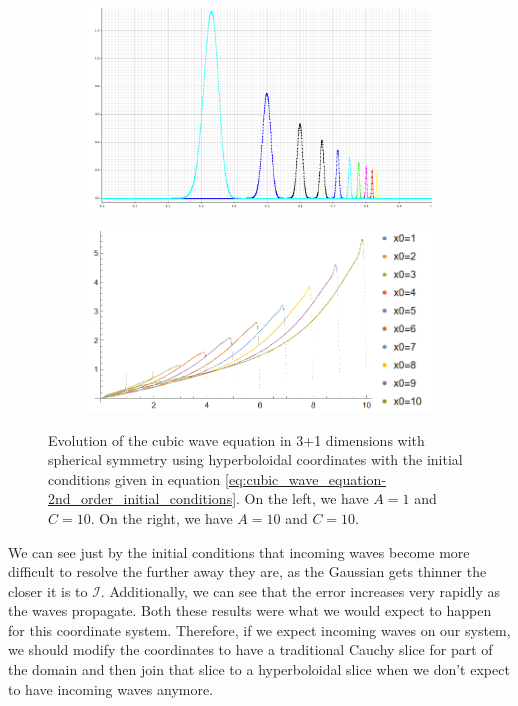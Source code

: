 \begin{figure}[h]
    \centering
    \begin{subfigure}[b]{0.45\textwidth}
        \centering
        \includegraphics[width=\textwidth]{Images/Incoming_IC.png}
    \end{subfigure}
    \hfill
    \begin{subfigure}[b]{0.45\textwidth}
        \centering
        \includegraphics[width=\textwidth]{Images/Incoming_Error.png}
    \end{subfigure}
    \caption{Evolution of the cubic wave equation in 3+1 dimensions with spherical symmetry using hyperboloidal coordinates with the initial conditions given in equation \eqref{eq:cubic_wave_equation-2nd_order_initial_conditions}. On the left, we have $A=1$ and $C=10$. On the right, we have  $A=10$ and $C=10$.}
    \label{fig:Incoming_Waves}
\end{figure}

We can see just by the initial conditions that incoming waves become more difficult to resolve the further away they are, as the Gaussian gets thinner the closer it is to $\mathscr{I}$. Additionally, we can see that the error increases very rapidly as the waves propagate. Both these results were what we would expect to happen for this coordinate system. Therefore, if we expect incoming waves on our system, we should modify the coordinates to have a traditional Cauchy slice for part of the domain and then join that slice to a hyperboloidal slice when we don't expect to have incoming waves anymore.